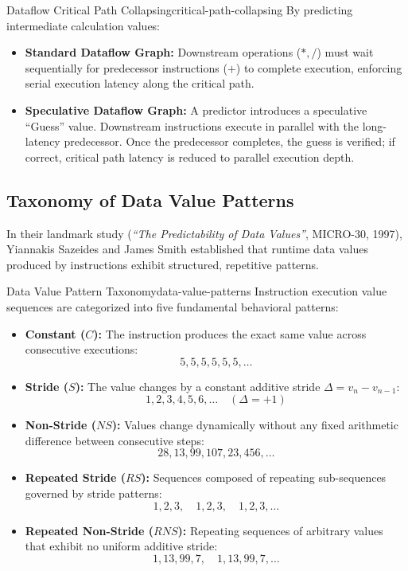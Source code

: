 \begin{concept}{Dataflow Critical Path Collapsing}{critical-path-collapsing}
By predicting intermediate calculation values:
\begin{itemize}
    \item \textbf{Standard Dataflow Graph:} Downstream operations ($*, /$) must wait sequentially for predecessor instructions ($+$) to complete execution, enforcing serial execution latency along the critical path.
    \item \textbf{Speculative Dataflow Graph:} A predictor introduces a speculative ``Guess'' value. Downstream instructions execute in parallel with the long-latency predecessor. Once the predecessor completes, the guess is verified; if correct, critical path latency is reduced to parallel execution depth.
\end{itemize}
\end{concept}

\subsection{Taxonomy of Data Value Patterns}
\label{subsec:value_pattern_taxonomy}

In their landmark study (\textit{``The Predictability of Data Values''}, MICRO-30, 1997), Yiannakis Sazeides and James Smith established that runtime data values produced by instructions exhibit structured, repetitive patterns.

\begin{definition}{Data Value Pattern Taxonomy}{data-value-patterns}
Instruction execution value sequences are categorized into five fundamental behavioral patterns:
\begin{itemize}
    \item \textbf{Constant ($C$):} The instruction produces the exact same value across consecutive executions:
    \[
    5, 5, 5, 5, 5, 5, \dots
    \]
    \item \textbf{Stride ($S$):} The value changes by a constant additive stride $\Delta = v_n - v_{n-1}$:
    \[
    1, 2, 3, 4, 5, 6, \dots \quad (\Delta = +1)
    \]
    \item \textbf{Non-Stride ($NS$):} Values change dynamically without any fixed arithmetic difference between consecutive steps:
    \[
    28, 13, 99, 107, 23, 456, \dots
    \]
    \item \textbf{Repeated Stride ($RS$):} Sequences composed of repeating sub-sequences governed by stride patterns:
    \[
    1, 2, 3, \quad 1, 2, 3, \quad 1, 2, 3, \dots
    \]
    \item \textbf{Repeated Non-Stride ($RNS$):} Repeating sequences of arbitrary values that exhibit no uniform additive stride:
    \[
    1, 13, 99, 7, \quad 1, 13, 99, 7, \dots
    \]
\end{itemize}
\end{definition}

